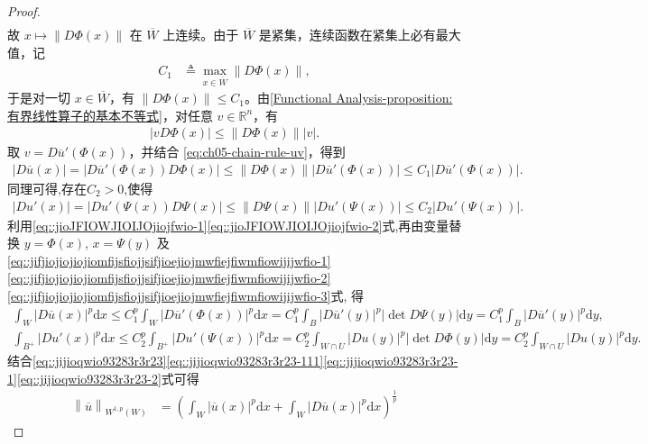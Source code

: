 \documentclass[../../main.tex]{subfiles}
\begin{document}
\begin{proof}
\begin{align*}
\end{align*}
故 \(x \mapsto \|D\Phi(x)\|\) 在 \(\overline{W}\) 上连续。由于 \(\overline{W}\) 是紧集，连续函数在紧集上必有最大值，记
\begin{align*}
C_1 &\triangleq \max_{x \in \overline{W}} \|D\Phi(x)\|,
\end{align*}
于是对一切 \(x \in \overline{W}\)，有 \(\|D\Phi(x)\| \leqslant C_1\)。由\cref{Functional Analysis-proposition:有界线性算子的基本不等式}，对任意 \(v \in \mathbb{R}^n\)，有
\begin{align*}
|v D\Phi(x)| \leqslant \|D\Phi(x)\| |v|.
\end{align*}
取 \(v = D\overline{u}'(\Phi(x))\)，并结合 \eqref{eq:ch05-chain-rule-uv}，得到
\begin{align}\label{eq::jioJFIOWJIOIJOjiojfwio-1}
|D\overline{u}(x)| = |D\overline{u}'(\Phi(x)) D\Phi(x)| \leqslant \|D\Phi(x)\| |D\overline{u}'(\Phi(x))| \leqslant C_1 |D\overline{u}'(\Phi(x))|.
\end{align}
同理可得,存在$C_2>0$,使得
\begin{align}\label{eq::jioJFIOWJIOIJOjiojfwio-2}
|Du'(x)| = |Du'(\Psi(x)) D\Psi(x)| \leqslant \|D\Psi(x)\| |Du'(\Psi(x))| \leqslant C_2 |Du'(\Psi(x))|.
\end{align}
利用\eqref{eq::jioJFIOWJIOIJOjiojfwio-1}\eqref{eq::jioJFIOWJIOIJOjiojfwio-2}式,再由变量替换 \(y = \Phi(x)\), \(x = \Psi(y)\) 及\eqref{eq::jifjiojiojiojiomfijsfiojjsifjioejiojmwfiejfiwmfiowijijwfio-1}\eqref{eq::jifjiojiojiojiomfijsfiojjsifjioejiojmwfiejfiwmfiowijijwfio-2}\eqref{eq::jifjiojiojiojiomfijsfiojjsifjioejiojmwfiejfiwmfiowijijwfio-3}式, 得
\begin{gather}
\int_W |D\overline{u}(x)|^p \mathrm{d}x \leqslant C_1^p \int_W |D\overline{u}'(\Phi(x))|^p \mathrm{d}x = C_1^p \int_B |D\overline{u}'(y)|^p |\det D\Psi(y)| \mathrm{d}y=C_1^p \int_B |D\overline{u}'(y)|^p \mathrm{d}y,\label{eq::jijioqwio93283r3r23-1}
\\
\int_{B^+}{\left| Du' \left( x \right) \right|^p\mathrm{d}x}\leqslant C_{2}^{p}\int_{B^+}{\left| Du' \left( \Psi \left( x \right) \right) \right|^p\mathrm{d}x}=C_{2}^{p}\int_{W\cap U}{\left| Du \left( y \right) \right|^p |\det D\Phi(y)|\mathrm{d}y}=C_{2}^{p}\int_{W\cap U}{\left| Du \left( y \right) \right|^p \mathrm{d}y}.\label{eq::jijioqwio93283r3r23-2}
\end{gather}
结合\eqref{eq::jijioqwio93283r3r23}\eqref{eq::jijioqwio93283r3r23-111}\eqref{eq::jijioqwio93283r3r23-1}\eqref{eq::jijioqwio93283r3r23-2}式可得
\begin{align}
\left\| \overline{u} \right\| _{W^{1,p}\left( W \right)}&=\left( \int_W{\left| \overline{u}\left( x \right) \right|^p\mathrm{d}x}+\int_W{\left| D\overline{u}\left( x \right) \right|^p\mathrm{d}x} \right) ^{\frac{1}{p}}\nonumber

\end{align}
\end{proof}
\end{document}

